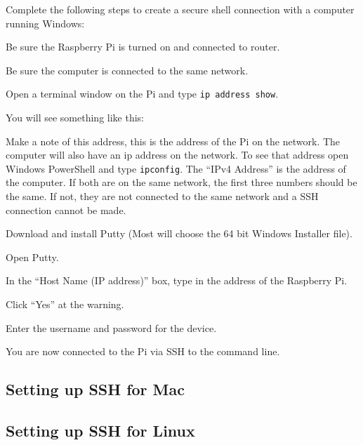 \documentclass[
]{book}
\begin{document}
Complete the following steps to create a secure shell connection with a computer running Windows:

Be sure the Raspberry Pi is turned on and connected to router.

Be sure the computer is connected to the same network.

Open a terminal window on the Pi and type \texttt{ip\ address\ show}.

You will see something like this:

Make a note of this address, this is the address of the Pi on the network. The computer will also have an ip address on the network. To see that address open Windows PowerShell and type \texttt{ipconfig}. The ``IPv4 Address'' is the address of the computer. If both are on the same network, the first three numbers should be the same. If not, they are not connected to the same network and a SSH connection cannot be made.

Download and install Putty (Most will choose the 64 bit Windows Installer file).

Open Putty.

In the ``Host Name (IP address)'' box, type in the address of the Raspberry Pi.

Click ``Yes'' at the warning.

Enter the username and password for the device.

You are now connected to the Pi via SSH to the command line.

\hypertarget{setting-up-ssh-for-mac}{%
\subsection{Setting up SSH for Mac}\label{setting-up-ssh-for-mac}}

\hypertarget{setting-up-ssh-for-linux}{%
\subsection{Setting up SSH for Linux}\label{setting-up-ssh-for-linux}}

  
\end{document}
